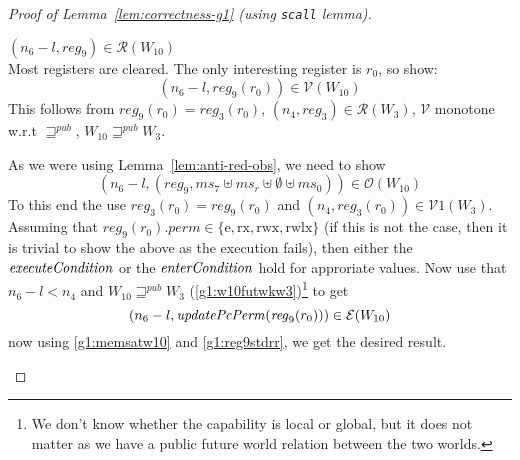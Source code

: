 \documentclass[a4paper]{article}
\newcommand{\var}[1]{\mathit{#1}}
\newcommand{\hs}{\var{ms}}
\newcommand{\ms}{\hs}
\newcommand{\reg}{\var{reg}}
\newcommand{\perm}{\var{perm}}
\newcommand{\plainfun}[2]{
  \ifthenelse{\equal{#2}{}}
  {\mathit{#1}}
  {\mathit{#1}(#2)}
}
\newcommand{\updatePcPerm}[1]{\plainfun{updatePcPerm}{#1}}
\newcommand{\execCond}[1]{\plainfun{executeCondition}{#1}}
\newcommand{\entryCond}[1]{\plainfun{enterCondition}{#1}}
\newcommand{\futurewk}{\mathbin{\sqsupseteq}^{\var{pub}}}
\newcommand{\asmType}{\plaindom{AsmType}}
\newcommand{\plaindom}[1]{\mathrm{#1}}
\newcommand{\intr}[2]{\mathcal{#1}}
\newcommand{\valueintr}[1]{\intr{V}{#1}}
\newcommand{\exprintr}[1]{\intr{E}{#1}}
\newcommand{\regintr}[1]{\intr{R}{#1}}
\newcommand{\stdvr}{\valueintr{\asmType}}
\newcommand{\stder}{\exprintr{\asmType}}
\newcommand{\stdrr}{\regintr{\asmType}}
\newcommand{\observations}{\mathcal{O}}
\newcommand{\npair}[2][n]{\left(#1,#2 \right)}
\newcommand{\plainperm}[1]{\mathrm{#1}}
\newcommand{\exec}{\plainperm{rx}}
\newcommand{\entry}{\plainperm{e}}
\newcommand{\rwx}{\plainperm{rwx}}
\newcommand{\rwlx}{\plainperm{rwlx}}
\begin{document}
\begin{proof}[Proof of Lemma~\ref{lem:correctness-g1} (using \texttt{scall} lemma)]
\begin{enumproof}[resume]
\begin{enumproof}
\begin{enumproof}
            \item $\npair[n_6-l]{\reg_9} \in \stdrr(W_{10})$ \label{g1:reg9stdrr}\\
              Most registers are cleared. The only interesting register is $r_0$, so show:
              \[
                \npair[n_6-l]{\reg_9(r_0)}\in \stdvr(W_{10})
              \]
              This follows from $\reg_9(r_0) = \reg_3(r_0)$, $\npair[n_4]{\reg_3} \in \stdrr(W_3)$, $\stdvr$ monotone w.r.t $\futurewk$, $W_{10} \futurewk W_3$.
            \end{enumproof}
            As we were using Lemma~\ref{lem:anti-red-obs}, we need to show
            \[
              \npair[n_6-l]{(reg_9,\ms_7 \uplus \ms_r \uplus \emptyset \uplus \ms_0)} \in \observations(W_{10})
            \]
            To this end the use $\reg_3(r_0) = \reg_9(r_0)$ and $\npair[n_4]{\reg_3(r_0)} \in \stdvr1(W_3)$. Assuming that $\reg_9(r_0).\perm \in \{\entry,\exec,\rwx,\rwlx \}$ (if this is not the case, then it is trivial to show the above as the execution fails), then either the $\execCond{}$ or the $\entryCond{}$ hold for approriate values. Now use that $n_6-l < n_4$ and $W_{10} \futurewk W_3$ (\ref{g1:w10futwkw3})\footnote{We don't know whether the capability is local or global, but it does not matter as we have a public future world relation between the two worlds.} to get
            \[
              \npair[n_6-l]{\updatePcPerm{\reg_9(r_0)}} \in \stder(W_{10})
            \]
            now using \ref{g1:memsatw10} and \ref{g1:reg9stdrr}, we get the desired result.
        \end{enumproof}
  \end{enumproof}

\end{proof}
\end{document}
